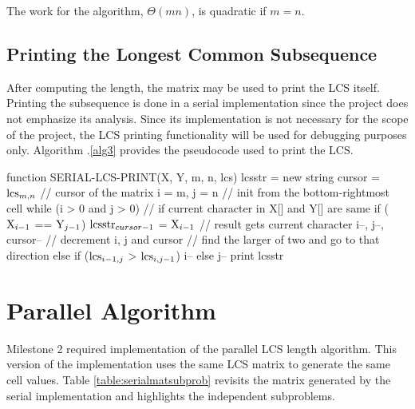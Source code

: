 \documentclass[usletter, 11pt]{extarticle}
\newcommand{\V}[1]{\textup{#1}}
\newcommand{\lcs}{\V{lcs}}
\newcommand{\seqone}{\V{X}}
\newcommand{\seqtwo}{\V{Y}}
\newcommand{\lcsstr}{\V{lcsstr}}
\begin{document}
        The work for the algorithm, $\Theta(mn)$, is quadratic if $m = n$.

        \subsection{Printing the Longest Common Subsequence} After computing
        the length, the matrix may be used to print the LCS itself. Printing
        the subsequence is done in a serial implementation since the project
        does not emphasize its analysis. Since its implementation is not
        necessary for the scope of the project, the LCS printing functionality
        will be used for debugging purposes only. Algorithm \thesection
        .\ref{alg3} provides the pseudocode used to print the LCS.

\begin{pseudocode}[caption={Serial Longest Common Subsequence Printing},
label={alg3}]
function SERIAL-LCS-PRINT(X, Y, m, n, lcs)
    lcsstr = new string
    cursor = $\lcs_{m,n}$ // cursor of the matrix
    i = m, j = n // init from the bottom-rightmost cell
    while (i > 0 and j > 0)
        // if current character in X[] and Y[] are same
        if ($\seqone_{i - 1}$ == $\seqtwo_{j - 1}$)
            $\lcsstr_{cursor - 1}$ = $\seqone_{i - 1}$  // result gets current character
            i--, j--, cursor-- // decrement i, j and cursor
        // find the larger of two and go to that direction
        else if ($\lcs_{i - 1, j}$ > $\lcs_{i,j - 1}$)
            i--
        else
            j--
    print lcsstr

\end{pseudocode}

    \section{Parallel Algorithm} Milestone 2 required implementation of the
    parallel LCS length algorithm. This version of the implementation uses the
    same LCS matrix to generate the same cell values. Table
    \ref{table:serialmatsubprob} revisits the matrix generated by the serial
    implementation and highlights the independent subproblems.
    \newpage
\end{document}
